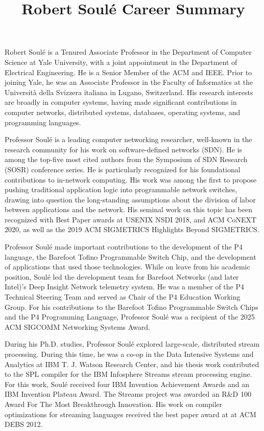 \documentclass[11pt]{article}
\title{ Robert Soul\'{e} Career Summary}
\author{  }
\date{ }
\begin{document}
\maketitle	
\thispagestyle{empty}


Robert Soul\'{e} is a Tenured Associate Professor in the Department of
Computer Science at Yale University, with a joint appointment in the
Department of Electrical Engineering. He is a Senior Member of 
the ACM and IEEE.  Prior to joining Yale, he was an Associate
Professor in the Faculty of Informatics at the Universit\`{a} della
Svizzera italiana in Lugano, Switzerland. His research interests are
broadly in computer systems, having made significant contributions
in computer networks, distributed systems, databases, operating systems,
and programming languages.



Professor Soul\'{e} is a leading computer networking researcher, well-known in the research community
for his work on software-defined networks (SDN). He is among the
top-five most cited authors from the Symposium of SDN Research (SOSR)
conference series. He is particularly recognized for his foundational
contributions to in-network computing.  His work was among the first
to propose pushing traditional application logic into programmable
network switches, drawing
into question the long-standing assumptions about the division of
labor between applications and the network. His seminal work on this topic has
been recognized with Best Paper awards at USENIX NSDI 2018, and ACM CoNEXT 2020,
as well as the 2019 ACM SIGMETRICS Highlights Beyond SIGMETRICS.


Professor Soul\'{e} made important contributions to the development of the P4
language, the Barefoot Tofino Programmable Switch Chip,
and the development of applications that used those
technologies. While on leave from his academic position, Soul\'{e} led
the development team for Barefoot Networks (and later Intel)'s Deep
Insight Network telemetry system. He was a member of the
P4 Technical Steering Team and served as Chair of the P4 Education
Working Group. For his contributions to the Barefoot Tofino
Programmable Switch Chips and the P4 Programming Language, Professor
Soul\'{e} was a recipient of the 2025 ACM SIGCOMM Networking Systems
Award.


During his Ph.D. studies, Professor Soul\'{e} explored large-scale,
distributed stream processing. During this time, he was a co-op in the
Data Intensive Systems and Analytics at IBM T. J. Watson Research
Center, and his thesis work contributed to the SPL compiler for the
IBM Infosphere Streams stream processing engine. For this work,
Soul\'{e} received four IBM Invention Achievement Awards and an IBM
Invention Plateau Award. The Streams project was awarded an R\&D 100
Award For The Most Breakthrough Innovation.  His work on compiler
optimizations for streaming languages received the best paper award at
at ACM DEBS 2012.
\end{document}
